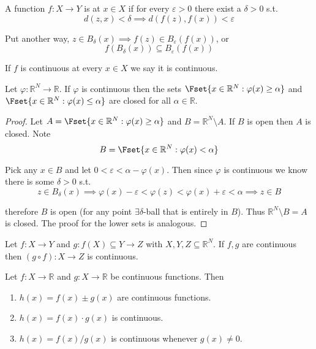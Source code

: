 \documentclass{article}
\begin{document}
\begin{definition}[continuity]\label{def:continuity_continuous}
  A function $f: X \to Y$ is  at $x \in X$ if for every $\varepsilon > 0$ there exist a $\delta > 0$ s.t.
  \[
    d(z, x) < \delta
    \implies
    d(f(z), f(x)) < \varepsilon
  \]

  Put another way, $z \in B_{\delta}(x) \implies f(z) \in B_{\varepsilon}(f(x))$, or
  \[
    f(B_{\delta}(x))
    \subseteq
    B_{\varepsilon}(f(x))
  \]

  If $f$ is continuous at every $x \in X$ we say it is continuous.
\end{definition}

\begin{proposition}
  Let $\varphi: \mathbb{R}^N \to \mathbb{R}$. If $\varphi$ is continuous then the sets $\Fset{x \in \mathbb{R}^N: \varphi(x) \ge \alpha}$ and $\Fset{x \in \mathbb{R}^N: \varphi(x)\le \alpha}$ are closed for all $\alpha \in \mathbb{R}$.
\end{proposition}

\begin{proof}
  Let $A = \Fset{x \in \mathbb{R}^N: \varphi(x) \ge \alpha}$ and $B = \mathbb{R}^N \setminus A$. If $B$ is open then $A$ is closed. Note
  \[
    B = \Fset{
      x \in \mathbb{R}^N: \varphi(x) < \alpha
    }
  \]

  Pick any $x \in B$ and let $0 < \varepsilon < \alpha - \varphi(x)$. Then since $\varphi$ is continuous we know there is some $\delta > 0$ s.t.
  \[
    z \in B_{\delta}(x)
    \implies
    \varphi(x) - \varepsilon
    <
    \varphi(z)
    <
    \varphi(x) + \varepsilon
    <
    \alpha
    \implies
    z \in B
  \]

  therefore $B$ is open (for any point $\exists \delta$-ball that is entirely in $B$). Thus $\mathbb{R}^N \setminus B = A$ is closed. The proof for the lower sets is analogous.
\end{proof}

\begin{theorem}
  Let $f: X \to Y$ and $g: f(X) \subseteq Y \to Z$ with $X, Y, Z \subseteq \mathbb{R}^N$. If $f, g$ are continuous then $(g \circ f): X \to Z$ is continuous.
\end{theorem}

\begin{theorem}
  Let $f: X \to \mathbb{R}$ and $g: X \to \mathbb{R}$ be continuous functions. Then
  \begin{enumerate}
    \item $h(x) = f(x) \pm g(x)$ are continuous functions.
    \item $h(x) = f(x) \cdot g(x)$ is continuous.
    \item $h(x) = f(x) / g(x)$ is continuous whenever $g(x) \ne 0$.
  \end{enumerate}
\end{theorem}
\end{document}
